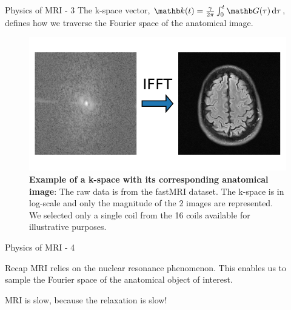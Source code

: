 \documentclass[aspectratio=169,xcolor=dvipsnames]{beamer}
\begin{document}
\begin{frame}{Physics of MRI - 3}
    The k-space vector, $\kb(t) = \frac{\gamma}{2\pi} \int_0^t \Gb(\tau) \dif \tau$, defines how we traverse the Fourier space of the anatomical image.

    \begin{figure}
        \centering
        \includegraphics[height=0.4\textheight]{Figures/intro_figures/kspace_to_image.pdf}
        \caption{\label{fig:example-kspace}\textbf{Example of a k-space with its corresponding anatomical image}: The raw data is from the fastMRI dataset. The k-space is in log-scale and only the magnitude of the 2 images are represented. We selected only a single coil from the 16 coils available for illustrative purposes.}
    \end{figure}
\end{frame}

\begin{frame}{Physics of MRI - 4}
    \begin{block}{Recap}
        MRI relies on the nuclear resonance phenomenon. This enables us to sample the Fourier space of the anatomical object of interest.
    \end{block}
    \pause
    MRI is slow, because the relaxation is slow!
\end{frame}
\end{document}
